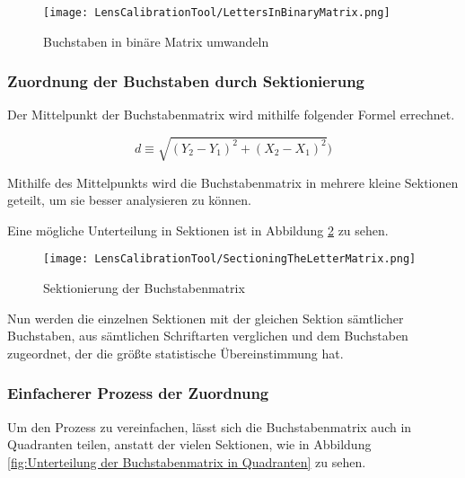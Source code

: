 \begin{figure}
    \centering
    \texttt{[image: LensCalibrationTool/LettersInBinaryMatrix.png]}
    \caption{Buchstaben in binäre Matrix umwandeln}
    \label{fig:Buchstaben in binäre Matrix umwandeln}
\end{figure}

\subsubsection{Zuordnung der Buchstaben durch Sektionierung}
{Der Mittelpunkt der Buchstabenmatrix wird mithilfe folgender Formel errechnet.}

\begin{equation}
    d\equiv\sqrt{ \left( Y_{2  } -Y_{1}\right)^2+\left(X_{2  } -X_{1}  \right)^2 })     
\end{equation}

Mithilfe des Mittelpunkts wird die Buchstabenmatrix in mehrere kleine Sektionen geteilt, um sie besser analysieren zu können. 


Eine mögliche Unterteilung in Sektionen ist in Abbildung \ref{fig:Sektionierung der Buchstabenmatrix} zu sehen.

\begin{figure}
    \centering
    \texttt{[image: LensCalibrationTool/SectioningTheLetterMatrix.png]}
    \caption{Sektionierung der Buchstabenmatrix}
    \label{fig:Sektionierung der Buchstabenmatrix}
\end{figure}

{Nun werden die einzelnen Sektionen mit der gleichen Sektion sämtlicher Buchstaben, aus sämtlichen Schriftarten verglichen und dem Buchstaben zugeordnet, der die größte statistische Übereinstimmung hat.
}
\\
\subsubsection{Einfacherer Prozess der Zuordnung}
{Um den Prozess zu vereinfachen, lässt sich die Buchstabenmatrix auch in Quadranten teilen, anstatt der vielen Sektionen, wie in Abbildung \ref{fig:Unterteilung der Buchstabenmatrix in Quadranten} zu sehen.
}

